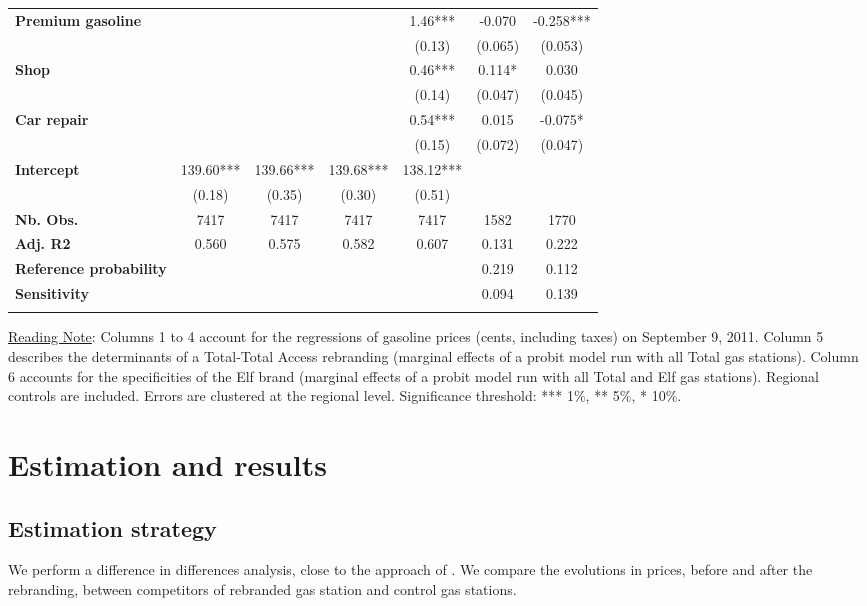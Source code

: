 \documentclass[english]{article}
\begin{document}
\begin{center}
\begin{footnotesize}
\begin{tabular}{l|cccccc}
\textbf{Premium gasoline}  &  &  &  & 1.46{*}{*}{*}  & -0.070  & -0.258{*}{*}{*}\tabularnewline
 &  &  &  & (0.13)  & (0.065)  & (0.053)\tabularnewline
\textbf{Shop}  &  &  &  & 0.46{*}{*}{*}  & 0.114{*}  & 0.030\tabularnewline
 &  &  &  & (0.14)  & (0.047)  & (0.045)\tabularnewline
\textbf{Car repair}  &  &  &  & 0.54{*}{*}{*}  & 0.015  & -0.075{*}\tabularnewline
 &  &  &  & (0.15)  & (0.072)  & (0.047)\tabularnewline
\hline
\textbf{Intercept}  & 139.60{*}{*}{*}  & 139.66{*}{*}{*}  & 139.68{*}{*}{*}  & 138.12{*}{*}{*}  &  & \tabularnewline
 & (0.18)  & (0.35)  & (0.30)  & (0.51)  &  & \tabularnewline
\hline
\textbf{Nb. Obs.}  & 7417  & 7417  & 7417  & 7417  & 1582  & 1770\tabularnewline
\textbf{Adj. R2}  & 0.560  & 0.575  & 0.582  & 0.607  & 0.131  & 0.222\tabularnewline
\textbf{Reference probability}  &  &  &  &  & 0.219  & 0.112\tabularnewline
\textbf{Sensitivity}  &  &  &  &  & 0.094  & 0.139\tabularnewline
\hline
\hline
\multicolumn{1}{l}{} &  &  &  &  &  & \tabularnewline
\end{tabular}\end{footnotesize}
\par\end{center}

{\small{}\uline{Reading Note}}{\small{}: } Columns 1 to 4 account for the regressions of gasoline prices (cents, including taxes) on September 9, 2011. Column 5 describes the determinants of a Total-Total Access rebranding (marginal effects of a probit model run with all Total gas stations). Column 6 accounts for the specificities of the Elf brand (marginal effects of a probit model run with all Total and Elf gas stations). Regional controls are included. Errors are clustered at the regional level. Significance threshold: {*}{*}{*} 1\%, {*}{*} 5\%, {*} 10\%.

\section{Estimation and results}

\subsection{Estimation strategy}

We perform a difference in differences analysis, close to the approach of \cite{HAS04}. We compare the evolutions in prices, before and after the rebranding, between competitors of rebranded gas station and control gas stations.\medskip{}
\end{document}
